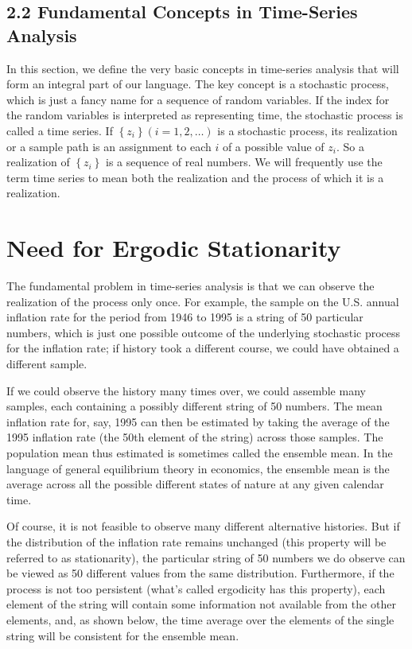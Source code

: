 \documentclass[10pt]{article}
\begin{document}
\subsection*{2.2 Fundamental Concepts in Time-Series Analysis}
In this section, we define the very basic concepts in time-series analysis that will form an integral part of our language. The key concept is a stochastic process, which is just a fancy name for a sequence of random variables. If the index for the random variables is interpreted as representing time, the stochastic process is called a time series. If $\left\{z_{i}\right\}(i=1,2, \ldots)$ is a stochastic process, its realization or a sample path is an assignment to each $i$ of a possible value of $z_{i}$. So a realization of $\left\{z_{i}\right\}$ is a sequence of real numbers. We will frequently use the term time series to mean both the realization and the process of which it is a realization.

\section*{Need for Ergodic Stationarity}
The fundamental problem in time-series analysis is that we can observe the realization of the process only once. For example, the sample on the U.S. annual inflation rate for the period from 1946 to 1995 is a string of 50 particular numbers, which is just one possible outcome of the underlying stochastic process for the inflation rate; if history took a different course, we could have obtained a different sample.

If we could observe the history many times over, we could assemble many samples, each containing a possibly different string of 50 numbers. The mean inflation rate for, say, 1995 can then be estimated by taking the average of the 1995 inflation rate (the 50th element of the string) across those samples. The population mean thus estimated is sometimes called the ensemble mean. In the language of general equilibrium theory in economics, the ensemble mean is the average across all the possible different states of nature at any given calendar time.

Of course, it is not feasible to observe many different alternative histories. But if the distribution of the inflation rate remains unchanged (this property will be referred to as stationarity), the particular string of 50 numbers we do observe can be viewed as 50 different values from the same distribution. Furthermore, if the process is not too persistent (what's called ergodicity has this property), each element of the string will contain some information not available from the other elements, and, as shown below, the time average over the elements of the single string will be consistent for the ensemble mean.
\end{document}
